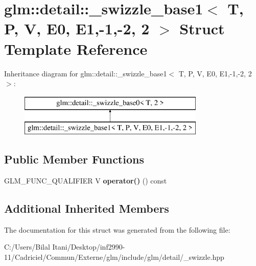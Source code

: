 \hypertarget{structglm_1_1detail_1_1__swizzle__base1_3_01_t_00_01_p_00_01_v_00_01_e0_00_01_e1_00-1_00-2_00_012_01_4}{}\section{glm\+:\+:detail\+:\+:\+\_\+swizzle\+\_\+base1$<$ T, P, V, E0, E1,-\/1,-\/2, 2 $>$ Struct Template Reference}
\label{structglm_1_1detail_1_1__swizzle__base1_3_01_t_00_01_p_00_01_v_00_01_e0_00_01_e1_00-1_00-2_00_012_01_4}
Inheritance diagram for glm\+:\+:detail\+:\+:\+\_\+swizzle\+\_\+base1$<$ T, P, V, E0, E1,-\/1,-\/2, 2 $>$\+:\begin{figure}[H]
\begin{center}
\leavevmode
\includegraphics[height=2.000000cm]{structglm_1_1detail_1_1__swizzle__base1_3_01_t_00_01_p_00_01_v_00_01_e0_00_01_e1_00-1_00-2_00_012_01_4}
\end{center}
\end{figure}
\subsection*{Public Member Functions}
\begin{DoxyCompactItemize}
\item 
G\+L\+M\+\_\+\+F\+U\+N\+C\+\_\+\+Q\+U\+A\+L\+I\+F\+I\+ER V {\bfseries operator()} () const \hypertarget{structglm_1_1detail_1_1__swizzle__base1_3_01_t_00_01_p_00_01_v_00_01_e0_00_01_e1_00-1_00-2_00_012_01_4_a333b1c869374c290a8bca707a258f5e5}{}\label{structglm_1_1detail_1_1__swizzle__base1_3_01_t_00_01_p_00_01_v_00_01_e0_00_01_e1_00-1_00-2_00_012_01_4_a333b1c869374c290a8bca707a258f5e5}

\end{DoxyCompactItemize}
\subsection*{Additional Inherited Members}


The documentation for this struct was generated from the following file\+:\begin{DoxyCompactItemize}
\item 
C\+:/\+Users/\+Bilal Itani/\+Desktop/inf2990-\/11/\+Cadriciel/\+Commun/\+Externe/glm/include/glm/detail/\+\_\+swizzle.\+hpp\end{DoxyCompactItemize}
